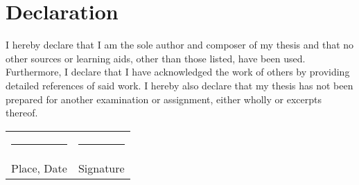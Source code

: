 
\chapter*{Declaration}

I hereby declare that I am the sole author and composer of my thesis and that no other sources or learning aids, other than those listed, have been used. Furthermore, I declare that I have acknowledged the work of others by providing detailed references of said work.  \newline
I hereby also declare that my thesis has not been prepared for another examination
or assignment, either wholly or excerpts thereof.
\\[3\normalbaselineskip]
\begin{tabular}{p{} l}
  \rule{\textwidth/3}{0.4pt}   &   \rule{\textwidth/3}{0.4pt} \\
  Place, Date                  &   Signature
\end{tabular}
